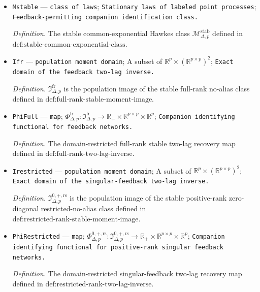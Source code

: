 \documentclass{article}
\begin{document}
\begin{itemize}
  \par\smallskip\noindent\emph{Definition.} \(\mathcal T_n^{\mathrm{fm}}(1-\alpha)\) is the optional full-parameter Wald ellipsoid only on \(\mathcal D_n\) when the ellipsoid is well defined; otherwise it equals \(\overline\Theta_{\Delta,p}\).
  \item \texttt{Mstable} --- \texttt{class of laws}; \texttt{Stationary laws of labeled point processes}; \texttt{Feedback-\allowbreak{}permitting companion identification class.}
  \par\smallskip\noindent\emph{Definition.} The stable common-exponential Hawkes class \(\mathcal M_{\Delta,p}^{\mathrm{stab}}\) defined in \(\text{def:stable-common-exponential-class}\).
  \item \texttt{Ifr} --- \texttt{population moment domain}; A subset of \(\mathbb R^p\times(\mathbb R^{p\times p})^2\); \texttt{Exact domain of the feedback two-\allowbreak{}lag inverse.}
  \par\smallskip\noindent\emph{Definition.} \(\mathfrak I_{\Delta,p}^{\mathrm{fr}}\) is the population image of the stable full-rank no-alias class defined in \(\text{def:full-rank-stable-moment-image}\).
  \item \texttt{PhiFull} --- \texttt{map}; \(\Phi^{\mathrm{fr}}_{\Delta,p}:\mathfrak I_{\Delta,p}^{\mathrm{fr}}\to\mathbb R_+\times\mathbb R^{p\times p}\times\mathbb R^p\); \texttt{Companion identifying functional for feedback networks.}
  \par\smallskip\noindent\emph{Definition.} The domain-restricted full-rank stable two-lag recovery map defined in \(\text{def:full-rank-two-lag-inverse}\).
  \item \texttt{Irestricted} --- \texttt{population moment domain}; A subset of \(\mathbb R^p\times(\mathbb R^{p\times p})^2\); \texttt{Exact domain of the singular-\allowbreak{}feedback two-\allowbreak{}lag inverse.}
  \par\smallskip\noindent\emph{Definition.} \(\mathfrak I_{\Delta,p}^{0,+,\mathrm{rs}}\) is the population image of the stable positive-rank zero-diagonal restricted-no-alias class defined in \(\text{def:restricted-rank-stable-moment-image}\).
  \item \texttt{PhiRestricted} --- \texttt{map}; \(\Phi_{\Delta,p}^{0,+,\mathrm{rs}}:\mathfrak I_{\Delta,p}^{0,+,\mathrm{rs}}\to\mathbb R_+\times\mathbb R^{p\times p}\times\mathbb R^p\); \texttt{Companion identifying functional for positive-\allowbreak{}rank singular feedback networks.}
  \par\smallskip\noindent\emph{Definition.} The domain-restricted singular-feedback two-lag recovery map defined in \(\text{def:restricted-rank-two-lag-inverse}\).

\end{itemize}
\end{document}
